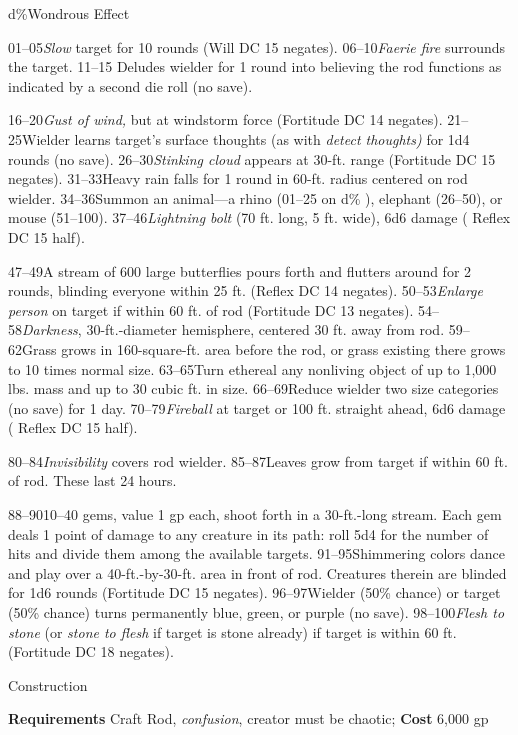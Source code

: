 d\%Wondrous Effect


01--05\textit{Slow }target for 10 rounds (Will DC 15 negates).
06--10\textit{Faerie fire }surrounds the target.
11--15
Deludes wielder for 1 round into believing the rod functions as indicated by a second die roll (no save).

16--20\textit{Gust of wind, }but at windstorm force (Fortitude DC 14 negates).
21--25Wielder learns target's surface thoughts (as with \textit{detect thoughts) }for 1d4 rounds (no save).
26--30\textit{Stinking cloud} appears at 30-ft. range (Fortitude DC 15 negates).
31--33Heavy rain falls for 1 round in 60-ft. radius centered on rod wielder.
34--36Summon an animal---a rhino (01--25 on 
d\%
), elephant (26--50), or mouse (51--100).
37--46\textit{Lightning bolt}
 (70 ft. long, 5 ft. wide), 6d6 damage (
Reflex
 DC 15 half).

47--49A stream of 600 large butterflies pours forth and flutters around for 2 rounds, blinding everyone within 25 ft. (Reflex DC 14 negates).
50--53\textit{Enlarge person} on target if within 60 ft. of rod (Fortitude DC 13 negates).
54--58\textit{Darkness}, 30-ft.-diameter hemisphere, centered 30 ft. away from rod.
59--62Grass grows in 160-square-ft. area before the rod, or grass existing there grows to 10 
times
 normal size.
63--65Turn ethereal any nonliving object of up to 1,000 lbs. mass and up to 30 cubic ft. in size.
66--69Reduce wielder two size categories (no save) for 1 day.
70--79\textit{Fireball}
 at target or 100 ft. straight ahead, 6d6 damage (
Reflex
 DC 15 half).

80--84\textit{Invisibility }covers rod wielder.
85--87Leaves grow from target if within 60 ft. of rod. 
These last 24 hours.

88--9010--40 gems, value 1 gp each, shoot forth in a 30-ft.-long stream. Each gem deals 1 point of damage to any creature in its path: roll 5d4 for the number of hits and divide them among the available targets.
91--95Shimmering colors dance and play over a 40-ft.-by-30-ft. area in front of rod. Creatures therein 
are 
blinded for 1d6 rounds (Fortitude DC 15 negates).
96--97Wielder (50\% chance) or target (50\% chance) turns permanently blue, green, or purple (no save).
98--100\textit{Flesh to stone }(or \textit{stone to flesh }if target is stone already) if target is within 60 ft. (Fortitude DC 18 negates). 

				
Construction
				
\textbf{Requirements} Craft Rod, \textit{confusion}, creator must be chaotic; \textbf{Cost }6,000 gp
        	
